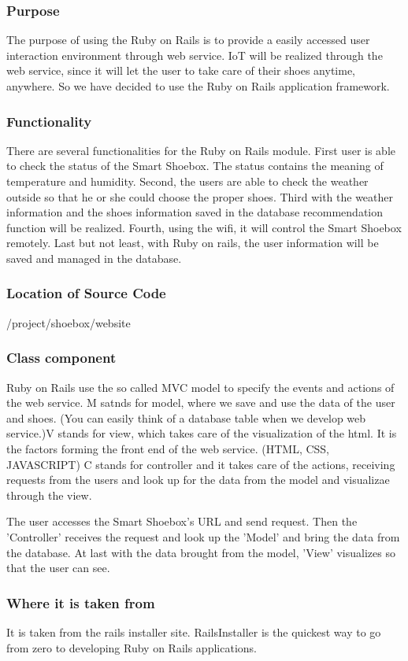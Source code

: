 \documentclass[conference]{IEEEtran}
\begin{document}
\subsubsection{Purpose} The purpose of using the Ruby on Rails is to provide a easily accessed user interaction environment through web service. IoT will be realized through the web service, since it will let the user to take care of their shoes anytime, anywhere. So we have decided to use the Ruby on Rails application framework.
\subsubsection{Functionality} There are several functionalities for the Ruby on Rails module. First user is able to check the status of the Smart Shoebox. The status contains the meaning of temperature and humidity. Second, the users are able to check the weather outside so that he or she could choose the proper shoes. Third with the weather information and the shoes information saved in the database recommendation function will be realized. Fourth, using the wifi, it will control the Smart Shoebox remotely. Last but not least, with Ruby on rails, the user information will be saved and managed in the database.
\subsubsection{Location of Source Code}/project/shoebox/website
\subsubsection{Class component} Ruby on Rails use the so called MVC model to specify the events and actions of the web service. M satnds for model, where we save and use the data of the user and shoes. (You can easily think of a database table when we develop web service.)V stands for view, which takes care of the visualization of the html. It is the factors forming the front end of the web service. (HTML, CSS, JAVASCRIPT) C stands for controller and it takes care of the actions, receiving requests from the users and look up for the data from the model and visualizae through the view.

The user accesses the Smart Shoebox's URL and send request. Then the 'Controller' receives the request and look up the 'Model' and bring the data from the database. At last with the data brought from the model, 'View' visualizes so that the user can see.

\subsubsection{Where it is taken from}It is taken from the rails installer site. RailsInstaller is the quickest way to go from zero to developing Ruby on Rails applications. 
 
\end{document}
